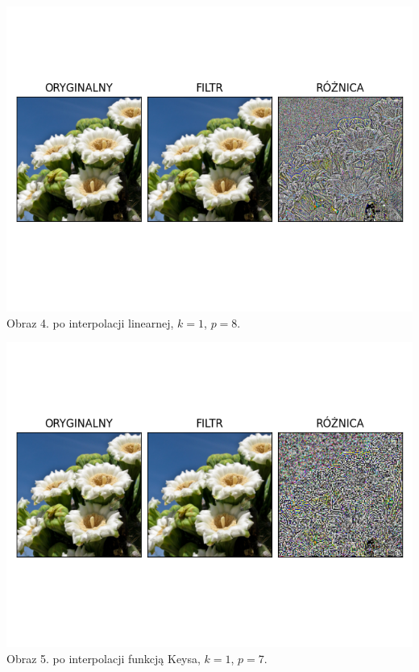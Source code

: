 \documentclass[14pt]{article}
\begin{document}
\begin{center}
    \includegraphics[scale=0.7]{images/lin_k1_p8.png}
    \\ \small Obraz 4. po interpolacji linearnej,
    $k=1$, $p=8$.

    \includegraphics[scale=0.7]{images/keys_k1_p7.png}
    \\ \small Obraz 5. po interpolacji funkcją Keysa,
    $k=1$, $p=7$.


\end{center}
\end{document}
